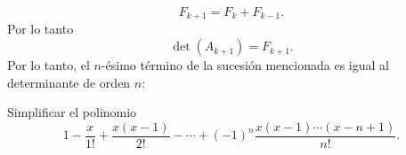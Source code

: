 \begin{examplebox}{}{}
    $$F_{k+1} = F_k + F_{k-1}.$$
    Por lo tanto
    $$\det(A_{k+1}) = F_{k+1}.$$
    Por lo tanto, el $n$-ésimo término de la sucesión mencionada es igual al determinante de orden $n$:
    \begin{matrizn}
    \end{matrizn}
\end{examplebox}

\newpage

\begin{examplebox}{}{}
    Simplificar el polinomio
    $$1 - \frac{x}{1!} + \frac{x(x - 1)}{2!} - \cdots + (-1)^n \frac{x(x - 1) \cdots (x - n + 1)}{n!}.$$


\end{examplebox}

